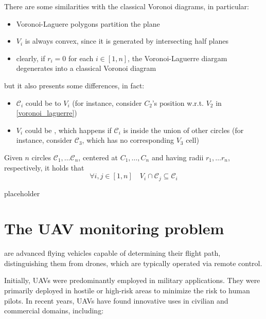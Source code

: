 \documentclass[a4paper, 12pt]{report}
\begin{document}
    There are some similarities with the classical Voronoi diagrams, in particular:

    \begin{itemize}
        \item Voronoi-Laguere polygons partition the plane
        \item $V_i$ is always convex, since it is generated by intersecting half planes
        \item clearly, if $r_i = 0$ for each $i \in [1, n]$, the Voronoi-Laguerre diargam degenerates into a classical Voronoi diagram
    \end{itemize}

    but it also presents some differences, in fact:

    \begin{itemize}
        \item $\mathscr C_i$ could be  to $V_i$ (for instance, consider $C_2$'s position w.r.t. $V_2$ in \cref{voronoi_laguerre})
        \item $V_i$ could be , which happens if $\mathscr C_i$ is inside the union of other circles (for instance, consider $\mathscr C_3$, which has no corresponding $V_3$ cell)
    \end{itemize}

    \begin{framedthm}{}
        Given $n$ circles $\mathscr C_1, \ldots \mathscr C_n$, centered at $C_1, \ldots, C_n$ and having radii $r_1, \ldots r_n$, respectively, it holds that $$\forall i, j \in [1, n] \quad V_i \cap \mathscr C_j \subseteq \mathscr C_i$$
    \end{framedthm}

    placeholder 

    \chapter{The UAV monitoring problem}
    
     are advanced flying vehicles capable of  determining their flight path, distinguishing them from drones, which are typically operated via remote control.

    Initially, UAVs were predominantly employed in military applications. They were primarily deployed in hostile or high-risk areas to minimize the risk to human pilots. In recent years, UAVs have found innovative uses in civilian and commercial domains, including:
\end{document}
